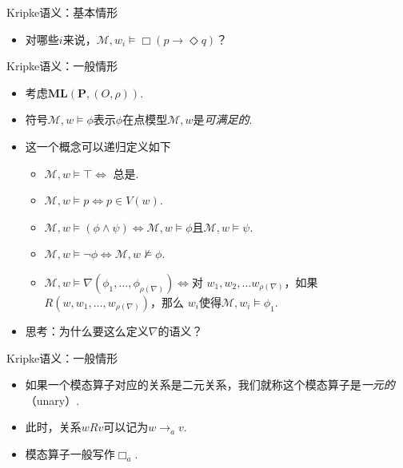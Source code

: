     \begin{frame}{Kripke语义：基本情形}
    \begin{figure}
        \centering
        
    \end{figure}
    \begin{itemize}
        \item 对哪些$i$来说，$\mathcal M,w_i\vDash\Box (p\to\Diamond q)$？
    \end{itemize}
    \end{frame}
    
    \begin{frame}{Kripke语义：一般情形}
    \begin{itemize}
        \item 考虑$\mathbf{ML}(\mathbf{P},(O,\rho))$.
        \item 符号$\mathcal M,w\vDash\phi$表示$\phi$在点模型$\mathcal M,w$是\emph{可满足的}.
        \item 这一个概念可以递归定义如下
        \begin{itemize}
            \item $\mathcal M, w\vDash\top\iff$ 总是.
            \item $\mathcal M, w\vDash p\iff p\in V(w)$.
            \item $\mathcal M, w\vDash (\phi\wedge\psi)\iff\mathcal M,w\vDash\phi$且$\mathcal M,w\vDash\psi$.
            \item $\mathcal M, w\vDash \neg\phi\iff\mathcal M,w\not\vDash\phi$.
            \item $\mathcal M, w\vDash \nabla(\phi_1,\dots,\phi_{\rho(\nabla)})\iff$对 $w_1,w_2,\dots w_{\rho(\nabla)}$，如果$R(w,w_1,\dots,w_{\rho(\nabla)})$，那么 $w_i$使得$\mathcal M,w_i\vDash\phi_1$.
        \end{itemize}
        \item 思考：为什么要这么定义$\nabla$的语义？
    \end{itemize}
    \end{frame}
    
    \begin{frame}{Kripke语义：一般情形}
    \begin{itemize}
        \item 如果一个模态算子对应的关系是二元关系，我们就称这个模态算子是\emph{一元的}（unary）.
        \item 此时，关系$wRv$可以记为$w\to_a v$.
        \item 模态算子一般写作$\Box_a$.
    \end{itemize}
    \end{frame}
    
